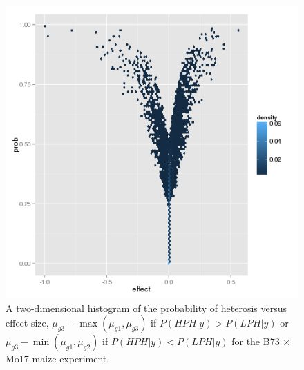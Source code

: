 \documentclass[useAMS,usenatbib,referee]{biom}
\begin{document}
\begin{figure}
\centerline{\includegraphics[width=\textwidth]{maize_volcano}}
\caption{A two-dimensional histogram of the probability of heterosis versus effect size, $\mu_{g3}-\max(\mu_{g1},\mu_{g3})$ if $P(HPH|y)>P(LPH|y)$ or $\mu_{g3}-\min(\mu_{g1},\mu_{g2})$ if $P(HPH|y)<P(LPH|y)$ for the B73 $\times$ Mo17 maize experiment.}
\label{f:volcano}
\end{figure}
\end{document}
